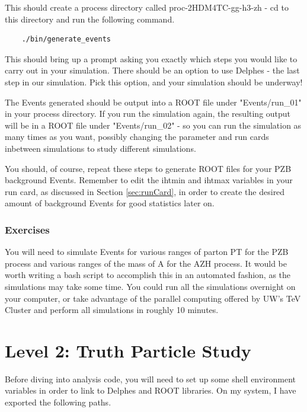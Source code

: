 \documentclass{article}
\begin{document}
This should create a process directory called proc-2HDM4TC-gg-h3-zh - cd to this directory and run the following command.

\begin{verbatim}
	./bin/generate_events
\end{verbatim}

This should bring up a prompt asking you exactly which steps you would like to carry out in
your simulation. There should be an option to use Delphes - the last step in our simulation.
Pick this option, and your simulation should be underway!

\bigskip

The Events generated should be output into a ROOT file under "Events/run\_01" in your
process directory. If you run the simulation again, the resulting output will be in a
ROOT file under "Events/run\_02" - so you can run the simulation as many times as you
want, possibly changing the parameter and run cards inbetween simulations to study different simulations.

\bigskip

You should, of course, repeat these steps to generate ROOT files for your PZB background Events. Remember
to edit the ihtmin and ihtmax variables in your run card, as discussed in Section \ref{sec:runCard}, in order to create the desired
amount of background Events for good statistics later on.

\subsubsection*{Exercises}

You will need to simulate Events for various ranges of parton PT for the PZB process and various ranges of the mass of A for the AZH process.
It would be worth writing a bash script to accomplish this in an automated fashion, as the simulations may take some time.
You could run all the simulations overnight on your computer, or take advantage of the parallel computing offered by UW's TeV Cluster
and perform all simulations in roughly 10 minutes.

\section{Level 2: Truth Particle Study}

Before diving into analysis code, you will need to set up some shell environment variables in order to link to
Delphes and ROOT libraries. On my system, I have exported the following paths.
\end{document}
